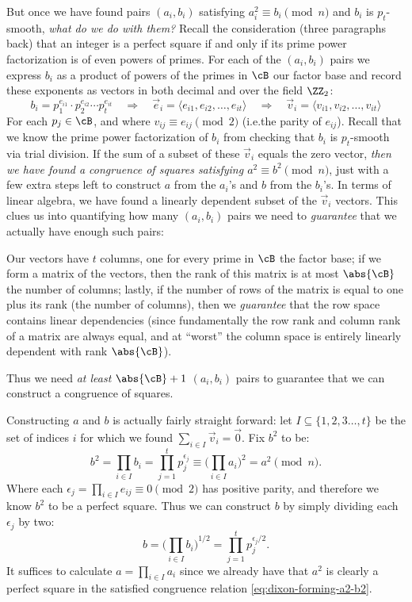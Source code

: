 \documentclass{report}
\begin{document}
But once we have found pairs $(a_i,b_i)$ satisfying $a_i^2\equiv b_i\pmod n$ and $b_i$ is
$p_t$-smooth, \emph{what do we do with them?} Recall the consideration (three paragraphs back) that
an integer is a perfect square if and only if its prime power factorization is of even powers of
primes. For each of the $(a_i,b_i)$ pairs we express $b_i$ as a product of powers of the primes in
$\cB$ our factor base and record these exponents as vectors in both decimal and over the field
$\ZZ_2$:
\begin{equation}
    b_i = p_1^{e_{i1}}\cdot p_2^{e_{i2}}\cdots p_t^{e_{it}}
    \quad\Rightarrow\quad
    \vec e_i = \langle e_{i1},e_{i2},\ldots,e_{it}\rangle
    \quad\Rightarrow\quad
    \vec v_i = \langle v_{i1},v_{i2},\ldots,v_{it} \rangle
\end{equation}
For each $p_j\in\cB$, and where $v_{ij}\equiv e_{ij}\pmod 2$ (i.e.\@ the parity of $e_{ij}$).
Recall that we know the prime power factorization of $b_i$ from checking that $b_i$ is $p_t$-smooth
via trial division. If the sum of a subset of these $\vec v_i$ equals the zero vector, \emph{then we
have found a congruence of squares satisfying $a^2\equiv b^2\pmod n$}, just with a few extra steps
left to construct $a$ from the $a_i$'s and $b$ from the $b_i$'s. In terms of linear algebra, we have
found a linearly dependent subset of the $\vec v_i$ vectors. This clues us into quantifying how many
$(a_i,b_i)$ pairs we need to \emph{guarantee} that we actually have enough such pairs:

\noindent
Our vectors have $t$ columns, one for every prime in $\cB$ the factor base; if we form a matrix of
the vectors, then the rank of this matrix is at most $\abs{\cB}$ the number of columns; lastly, if
the number of rows of the matrix is equal to one plus its rank (the number of columns), then we
\emph{guarantee} that the row space contains linear dependencies (since fundamentally the row rank
and column rank of a matrix are always equal, and at ``worst'' the column space is entirely linearly
dependent with rank $\abs{\cB}$).

\noindent
Thus we need \emph{at least} $\abs{\cB}+1$ $(a_i,b_i)$ pairs to guarantee that we can construct a
congruence of squares.

Constructing $a$ and $b$ is actually fairly straight forward:
let $I\subseteq\{1,2,3\ldots,t\}$ be the set of indices $i$ for which we found
$\sum_{i\in I}\vec v_i = \vec 0$.
Fix $b^2$ to be:
\begin{equation}\label{eq:dixon-forming-a2-b2}
    b^2 = \prod_{i\in I} b_i = \prod_{j=1}^t p_j^{\epsilon_j}
    \equiv \Big(\prod_{i\in I}a_i\Big)^2 = a^2 \pmod n.
\end{equation}
Where each $\epsilon_j = \prod_{i\in I} e_{ij}\equiv 0\pmod 2$ has positive parity,
and therefore we know $b^2$ to be a perfect square.
Thus we can construct $b$ by simply dividing each $\epsilon_j$ by two:
\begin{equation}
    b = {\Big(\prod_{i\in I} b_i\Big)}^{1/2} = \prod_{j=1}^t p_j^{\epsilon_j/2}.
\end{equation}
It suffices to calculate $a=\prod_{i\in I}a_i$ since we already have that $a^2$ is clearly a perfect
square in the satisfied congruence relation \cref{eq:dixon-forming-a2-b2}.
\end{document}
